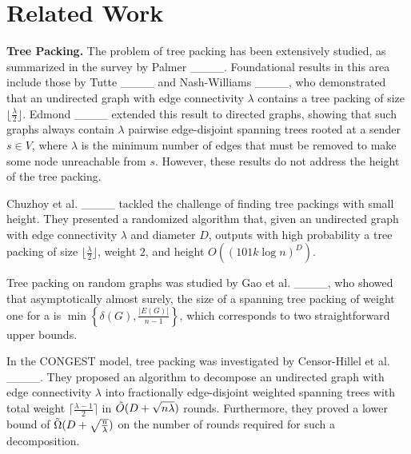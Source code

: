 \section{Related Work}
\textbf{Tree Packing.} The problem of tree packing has been extensively studied, as summarized in the survey by Palmer ____. Foundational results in this area include those by Tutte ____ and Nash-Williams ____, who demonstrated that an undirected graph with edge connectivity $\lambda$ contains a tree packing of size $\lfloor \frac{\lambda}{2} \rfloor$. Edmond ____ extended this result to directed graphs, showing that such graphs always contain $\lambda$ pairwise edge-disjoint spanning trees rooted at a sender $s \in V$, where $\lambda$ is the minimum number of edges that must be removed to make some node unreachable from $s$. However, these results do not address the height of the tree packing.

    Chuzhoy et al. ____ tackled the challenge of finding tree packings with small height. They presented a randomized algorithm that, given an undirected graph with edge connectivity $\lambda$ and diameter $D$, outputs with high probability a tree packing of size $\lfloor \frac{\lambda}{2} \rfloor$, weight $2$, and height $O((101k \log n)^D)$.

    Tree packing on random graphs was studied by Gao et al. ____, who showed that asymptotically almost surely, the size of a spanning tree packing of weight one for a {\graph} is $\min\left\{\delta(G), \frac{|E(G)|}{n - 1}\right\}$, which corresponds to two straightforward upper bounds.

    In the CONGEST model, tree packing was investigated by Censor-Hillel et al. ____. They proposed an algorithm to decompose an undirected graph with edge connectivity $\lambda$ into fractionally edge-disjoint weighted spanning trees with total weight $\lceil \frac{\lambda - 1}{2}\rceil$ in $\Tilde{O}(D + \sqrt{n\lambda})$ rounds. Furthermore, they proved a lower bound of $\Tilde{\Omega}(D + \sqrt{\frac{n}{\lambda}})$ on the number of rounds required for such a decomposition.

